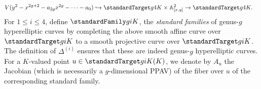 \begin{definition}
\begin{align*}
V(y^2 - x^{2g+2} - a_{2g}x^{2g} - \cdots - a_0) &\hookrightarrow \standardTarget g 4 K \times \mathbb A^2_{[x,y]} \to \standardTarget g 4 K.
\end{align*}
For $1 \leq i \leq 4$, define $\standardFamily g i K$, the \emph{standard families} of genus-$g$ hyperelliptic curves by completing the above smooth affine
curve over $\standardTarget g i K$ to a smooth projective curve over $\standardTarget g i K$. The definition of $\Delta^{(i)}$ ensures that these are indeed genus-$g$ hyperelliptic curves. 
For a $K$-valued point $u \in \standardTarget g i K (K)$, we denote by $A_u$ the Jacobian (which is necessarily a $g$-dimensional PPAV) of the fiber over $u$ of the corresponding standard family.
\begin{comment}
and define the standard family $\standardFamily g i K$ to be the completion of the family $\widetilde{\standardFamily g i K}$ to a smooth projective curve over $\mathbb A^{2g+3 - i}$.

The four {\it standard families} of genus-$g$ hyperelliptic curves over $K$ are denoted by $\standardFamily g i K$ for $i \in \left\{ 1,2,3, 4 \right\}$ and may be defined as follows. Consider the following vanishing loci, and view them as families via projection onto the first factor:
\begin{align*}
	\widetilde{\standardFamily g 1 K}  & = V(y^2 - x^{2g+1} - a_{2g}x^{2g} - \cdots - a_0) \hookrightarrow \mathbb A^{2g+1}_{[a_0, \ldots, a_{2g}]} \times \mathbb A^2_{[x,y]} \to \mathbb A^{2g+1}_{[a_0, \ldots, a_{2g}]}, \\
	\widetilde{\standardFamily g 2 K} & = V(y^2 - x^{2g+2} - a_{2g+1}x^{2g+1} - \cdots - a_0) \hookrightarrow \mathbb A^{2g+2}_{[a_0, \ldots, a_{2g+1}]} \times \mathbb A^2_{[x,y]} \to \mathbb A^{2g+2}_{[a_0, \ldots, a_{2g+1}]},  \\
	\widetilde{\standardFamily g 3 K} & = V(y^2 - x^{2g+1} - a_{2g-1}x^{2g-1} - \cdots - a_0) \hookrightarrow \mathbb A^{2g}_{[a_0, \ldots, a_{2g-1}]} \times \mathbb A^2_{[x,y]} \to  \mathbb A^{2g}_{[a_0, \ldots, a_{2g-1}]}, \text{ and} \\
	\widetilde{\standardFamily g 4 K} &= V(y^2 - x^{2g+2} - a_{2g}x^{2g} - \cdots - a_0) \hookrightarrow \mathbb A^{2g+1}_{[a_0, \ldots, a_{2g}]} \times \mathbb A^2_{[x,y]} \to \mathbb A^{2g+1}_{[a_0, \ldots, a_{2g}]}.
\end{align*}
and define the standard family $\standardFamily g i K$ to be the completion of the family $\widetilde{\standardFamily g i K}$ to a smooth projective curve over $\mathbb A^{2g+3 - i}$.
\end{comment}
\end{definition}

